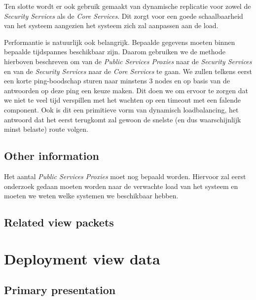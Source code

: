 \documentclass[a4paper,10pt]{article}
\begin{document}
Ten slotte wordt er ook gebruik gemaakt van dynamische replicatie voor zowel de \textit{Security Services} als de \textit{Core Services}. Dit zorgt voor een goede schaalbaarheid van het systeem aangezien het systeem zich zal aanpassen aan de load.

Performantie is natuurlijk ook belangrijk. Bepaalde gegevens moeten binnen bepaalde tijdspannes beschikbaar zijn. Daarom gebruiken we de methode hierboven beschreven om van de \textit{Public Services Proxies} naar de \textit{Security Services} en van de \textit{Security Services} naar de \textit{Core Services} te gaan. We zullen telkens eerst een korte ping-boodschap sturen naar minstens 3 nodes en op basis van de antwoorden op deze ping een keuze maken. Dit doen we om ervoor te zorgen dat we niet te veel tijd verspillen met het wachten op een timeout met een falende component. Ook is dit een primitieve vorm van dynamisch loadbalancing, het antwoord dat het eerst terugkomt zal gewoon de snelste (en dus waarschijnlijk minst belaste) route volgen.

\subsection{Other information}
Het aantal \textit{Public Services Proxies} moet nog bepaald worden. Hiervoor zal eerst onderzoek gedaan moeten worden naar de verwachte load van het systeem en moeten we weten welke systemen we beschikbaar hebben.

\subsection{Related view packets}



\clearpage
\section{Deployment view data}
\label{sec:deployment_data}

\subsection{Primary presentation}
\end{document}
